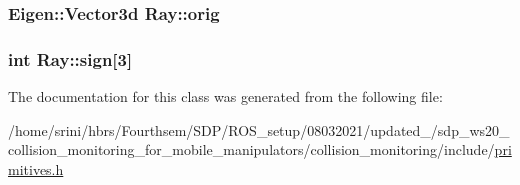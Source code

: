 \subsubsection[{\texorpdfstring{orig}{orig}}]{\setlength{\rightskip}{0pt plus 5cm}Eigen\+::\+Vector3d Ray\+::orig}\hypertarget{class_ray_a21776ed09fa0cff97b5eb3d35cd40c97}{}\label{class_ray_a21776ed09fa0cff97b5eb3d35cd40c97}
\subsubsection[{\texorpdfstring{sign}{sign}}]{\setlength{\rightskip}{0pt plus 5cm}int Ray\+::sign\mbox{[}3\mbox{]}}\hypertarget{class_ray_aa9c97528be491d67e22755de4b2a60b7}{}\label{class_ray_aa9c97528be491d67e22755de4b2a60b7}


The documentation for this class was generated from the following file\+:\begin{DoxyCompactItemize}
\item 
/home/srini/hbrs/\+Fourthsem/\+S\+D\+P/\+R\+O\+S\+\_\+setup/08032021/updated\+\_/sdp\+\_\+ws20\+\_\+collision\+\_\+monitoring\+\_\+for\+\_\+mobile\+\_\+manipulators/collision\+\_\+monitoring/include/\hyperlink{primitives_8h}{primitives.\+h}\end{DoxyCompactItemize}
